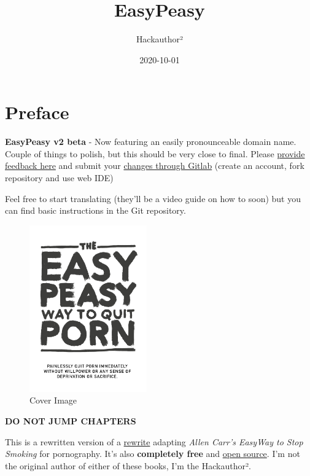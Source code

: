 \documentclass[
]{book}
\title{EasyPeasy}
\author{Hackauthor²}
\date{2020-10-01}
\begin{document}
\maketitle

{
\setcounter{tocdepth}{1}
\tableofcontents
}
\hypertarget{preface}{%
\chapter*{Preface}\label{preface}}

\textbf{EasyPeasy v2 beta} - Now featuring an easily pronounceable domain name. Couple of things to polish, but this should be very close to final. Please \href{https://boards.coomer.org/easy/res/1.html}{provide feedback here} and submit your \href{https://gitlab.com/snuggy/easypeasy/}{changes through Gitlab} (create an account, fork repository and use web IDE)

Feel free to start translating (they'll be a video guide on how to soon) but you can find basic instructions in the Git repository.

\begin{figure}
\centering
\includegraphics[width=0.45\textwidth,height=0.45\textheight]{images/easypeasy.jpg}
\caption{Cover Image}
\end{figure}

{\textbf{DO NOT JUMP CHAPTERS}}

This is a rewritten version of a \href{https://sites.google.com/site/hackbookeasypeasy}{rewrite} adapting \emph{Allen Carr's EasyWay to Stop Smoking} for pornography. It's also \textbf{completely free} and \href{https://gitlab.com/snuggy/easypeasy}{open source}. I'm not the original author of either of these books, I'm the Hackauthor².
\end{document}

